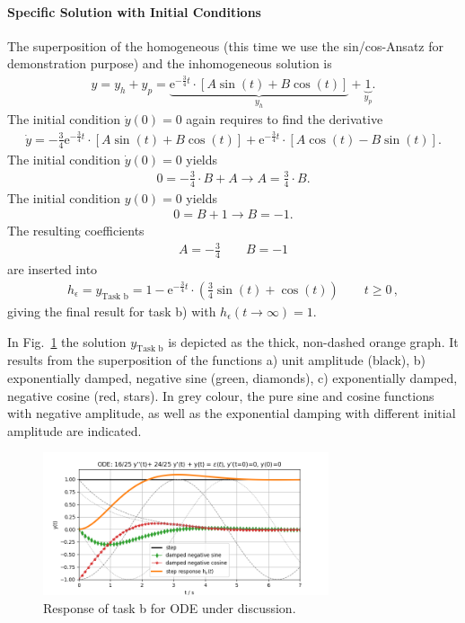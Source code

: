 \paragraph{Specific Solution with Initial Conditions}
The superposition of the homogeneous (this time we use the sin/cos-Ansatz
 for demonstration purpose) and the inhomogeneous
solution is
\begin{align}
\label{eq:SpecificyTaskb}
y = y_h + y_p = \underbrace{
\mathrm{e}^{-\frac{3}{4} t} \cdot
\left[ A \sin(t) + B  \cos(t)\right]}_{y_h} +\underbrace{1}_{y_p}.
\end{align}
The initial condition $\dot{y}(0) = 0$ again requires to find the derivative
\begin{align}
\dot{y}
=
-\frac{3}{4}\mathrm{e}^{-\frac{3}{4} t} \cdot
\left[ A \sin(t) + B \cos(t)\right]
+
\mathrm{e}^{-\frac{3}{4} t} \cdot
\left[ A \cos(t)  - B \sin(t)\right].
\end{align}
The initial condition $\dot{y}(0) = 0$ yields
\begin{align}
0 = -\frac{3}{4}\cdot B + A \rightarrow A = \frac{3}{4}\cdot B.
\end{align}
The initial condition ${y}(0) = 0$ yields
\begin{align}
0 = B  + 1 \rightarrow B = -1.
\end{align}
The resulting coefficients
\begin{align}
A = -\frac{3}{4}\qquad B = -1
\end{align}
are inserted into 
\begin{align}
\boxed{
h_\epsilon = y_\text{Task b} =
1 - \mathrm{e}^{-\frac{3}{4} t} \cdot
\left(\frac{3}{4} \sin(t) + \cos(t)\right) \qquad t \geq 0
}\,,
\end{align}
giving the final result for task b) with $h_\epsilon(t\to\infty) = 1$.

In Fig.~\ref{fig:step_response_parts} the solution $y_\text{Task b}$ is depicted
as the thick, non-dashed orange graph. It results from the superposition of the
functions
a) unit amplitude (black),
b) exponentially damped, negative sine (green, diamonds),
c) exponentially damped, negative cosine (red, stars).
In grey colour, the pure sine and cosine functions with negative amplitude,
as well as the exponential
damping with different initial amplitude are indicated.

\begin{figure}[h!]
\centering
\includegraphics[width=0.75\textwidth]{../laplace_transform/step_response_parts}
\caption{Response of task b for ODE under discussion.}
\label{fig:step_response_parts}
\end{figure}

